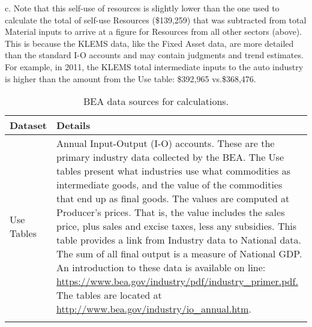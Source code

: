 \footnotesize{c. Note that this self-use of resources is slightly lower than the one used to calculate the total of self-use Resources (\$139,259) that was subtracted from total Material inputs to arrive at a figure for Resources from all other sectors (above). This is because the KLEMS data, like the Fixed Asset data, are more detailed than the standard I-O accounts and may contain judgments and trend estimates.  For example, in 2011, the KLEMS total intermediate inputs to the auto industry is higher than the amount from the Use table: \$392,965 vs.\$368,476.}

\begin{table}
\caption[BEA data sources for calcuations]{BEA data sources for calculations.}
\begin{center}
  \begin{tabular}{l @{\hspace{2em}} p{10cm}}
   \toprule 
    Dataset & Details  \\ 

	\midrule
Use Tables & Annual Input-Output (I-O) accounts. These are the primary industry data collected by the BEA. The Use tables present what industries use what  commodities as intermediate goods, and the value of the commodities that end up as final goods. The values are computed at Producer’s prices. That is, the value includes the sales price, plus sales and excise taxes, less any subsidies. This table provides a link from Industry data to National data. The sum of all final output is a measure of National GDP.  An introduction to these data is available on line: \url{https://www.bea.gov/industry/pdf/industry_primer.pdf.} The tables are located at \url{ http://www.bea.gov/industry/io\_annual.htm}.\\
&\\


\end{tabular}
\end{center}
\end{table}
